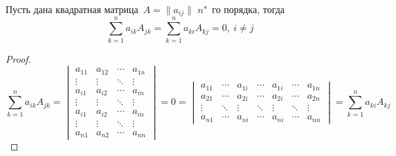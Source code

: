 \begin{consequent}
Пусть дана квадратная матрица~$A = \|a_{ij}\|$ $n$"~го порядка, тогда
\begin{equation*}
\sum_{k=1}^n a_{ik} A_{jk} = \sum_{k=1}^n a_{ki} A_{kj} = 0, \ i \neq j
\end{equation*}
\end{consequent}
\begin{proof}
\begin{equation*}
\sum_{k=1}^n a_{ik} A_{jk} =
\begin{vmatrix}
a_{11} & a_{12} & \cdots & a_{1n} \\
\vdots & \vdots & \ddots & \vdots \\
a_{i1} & a_{i2} & \cdots & a_{in} \\
\vdots & \vdots & \ddots & \vdots \\
a_{i1} & a_{i2} & \cdots & a_{in} \\
\vdots & \vdots & \ddots & \vdots \\
a_{n1} & a_{n2} & \cdots & a_{nn}
\end{vmatrix} = 0 =
\begin{vmatrix}
a_{11} & \cdots & a_{1i} & \cdots & a_{1i} & \cdots & a_{1n} \\
a_{21} & \cdots & a_{2i} & \cdots & a_{2i} & \cdots & a_{2n} \\
\vdots & \ddots & \vdots & \ddots & \vdots & \ddots & \vdots \\
a_{n1} & \cdots & a_{ni} & \cdots & a_{ni} & \cdots & a_{nn}
\end{vmatrix} =
\sum_{k=1}^n a_{ki} A_{kj}
\end{equation*}
\end{proof}

